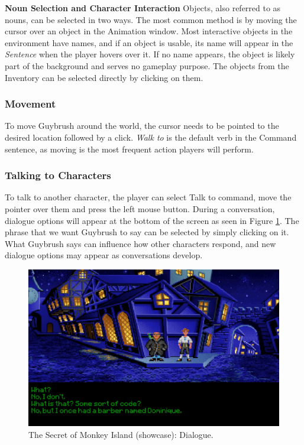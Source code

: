 \textbf{Noun Selection and Character Interaction}
Objects, also referred to as nouns, can be selected in two ways. The most common method is by moving the cursor over an object in the Animation window. Most interactive objects in the environment have names, and if an object is usable, its name will appear in the \textit{Sentence} when the player hovers over it. If no name appears, the object is likely part of the background and serves no gameplay purpose. The objects from the Inventory can be selected directly by clicking on them.

\subsubsection{Movement}
To move Guybrush around the world, the cursor needs to be pointed to the desired location followed by a click. \textit{Walk to} is the default verb in the Command sentence, as moving is the most frequent action players will perform.

\subsubsection{Talking to Characters}
To talk to another character, the player can select Talk to command, move the pointer over them and press the left mouse button. During a conversation, dialogue options will appear at the bottom of the screen as seen in Figure \ref{fig:TSoM-manual2}.  The phrase that we want Guybrush to say can be selected by simply clicking on it. What Guybrush says can influence how other characters respond, and new dialogue options may appear as conversations develop.

\begin{figure}[H]
\centering
\includegraphics[width=.85\linewidth]{img/User doc/manual-tsomi.png}
\caption{The Secret of Monkey Island (showcase): Dialogue.}
\label{fig:TSoM-manual2}
\end{figure}


